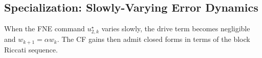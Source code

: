 \documentclass[letterpaper, 10 pt, conference]{ieeeconf}  %
\begin{document}

\subsection{Specialization: Slowly-Varying Error Dynamics}
When the FNE command $u_{2,k}^\star$ varies slowly, the drive term becomes negligible and $w_{k+1}=\alpha w_k$. The CF gains then admit closed forms in terms of the block Riccati sequence.
\end{document}
